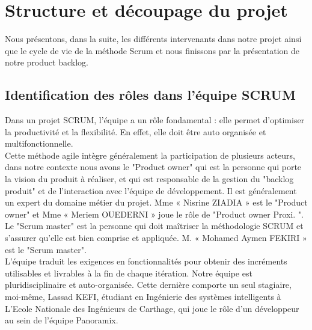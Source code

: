\section[Structure et découpage du projet]{Structure et découpage du projet}
Nous présentons, dans la suite, les différents intervenants dans notre projet ainsi que le cycle de vie de la méthode Scrum et nous finissons par la présentation de notre product backlog.
\subsection[Identification des rôles dans l’équipe SCRUM]{Identification des rôles dans l’équipe SCRUM}
Dans un projet SCRUM, l’équipe a un rôle fondamental : elle permet d’optimiser la productivité et la flexibilité. En effet, elle doit être auto organisée et multifonctionnelle.\\
Cette méthode agile intègre généralement la participation de plusieurs acteurs, dans notre contexte nous avons le "Product owner" qui  est la personne qui porte la vision du produit à réaliser, et qui est responsable de la gestion du "backlog produit" et de l'interaction avec l'équipe de développement. Il est généralement un expert du domaine métier du projet. Mme « Nisrine ZIADIA » est le "Product owner" et Mme « Meriem OUEDERNI »  joue le rôle de "Product owner Proxi. ".\\
Le "Scrum master" est la personne qui doit maîtriser la méthodologie SCRUM et s’assurer qu'elle est bien comprise et appliquée. M. « Mohamed Aymen FEKIRI » est le "Scrum master".\\
L'équipe traduit les exigences en fonctionnalités pour obtenir des incréments utilisables et livrables à la fin de chaque itération. Notre équipe est pluridisciplinaire et auto-organisée. Cette dernière comporte un seul stagiaire, moi-même, Lassad KEFI, étudiant en Ingénierie des systèmes intelligents à L'Ecole Nationale des Ingénieurs de Carthage, qui joue le rôle d’un développeur au sein de l’équipe Panoramix.
